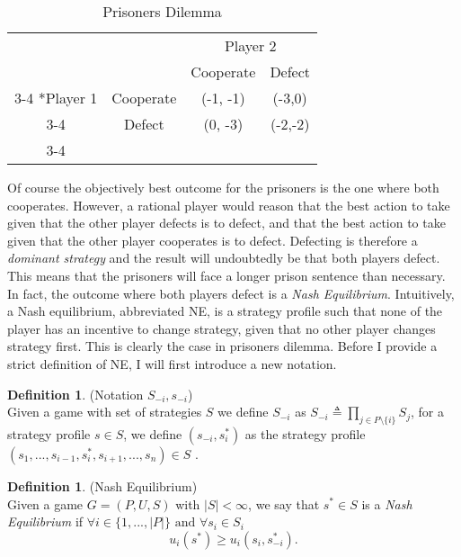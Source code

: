 \documentclass{article}
\theoremstyle{definition}
\newtheorem{definition}[theorem]{Definition}
\theoremstyle{remark}
\begin{document}
\begin{table}[h!]
  \centering
  \setlength{\extrarowheight}{2pt}
  \begin{tabular}{cc|c|c|}
    & \multicolumn{1}{c}{} & \multicolumn{2}{c}{Player 2}\\
    & \multicolumn{1}{c}{} & \multicolumn{1}{c}{Cooperate}  &
                                                              \multicolumn{1}{c}{Defect}
    \\\cline{3-4}
    \multirow{2}*{Player 1}  & Cooperate & (-1, -1) &
                                                                   (-3,0) \\\cline{3-4}
    & Defect & (0, -3) & (-2,-2) \\\cline{3-4}
  \end{tabular}
  \caption{Prisoners Dilemma}
  \label{Prisoners Dilemma}
\end{table}

Of course the objectively best outcome for the prisoners is the one
where both cooperates. However, a rational player would reason that the
best action to take given that the other player defects is to defect, and
that the best action to take given that the other player cooperates is
to defect. Defecting is therefore a \emph{dominant strategy} and the
result will undoubtedly be that both players defect. This means that
the prisoners will face a longer prison sentence than necessary. In
fact, the outcome where both players defect is a \emph{Nash
  Equilibrium}. Intuitively, a Nash equilibrium, abbreviated NE, is a
strategy profile such that none of the player has an incentive to
change strategy, given that no other player changes strategy
first. This is clearly the case in prisoners dilemma. Before I provide
a strict definition of NE, I will first introduce a new notation.

\begin{definition}(Notation $S_{-i}, s_{-i}$)\label{Notation S-i}\\
Given a game with set of strategies $S$ we define $S_{-i}$ as $S_{-i} \triangleq
\prod_{j \in P \setminus \{i\}} S_j$, for a strategy profile $s \in
S$, we define $(s_{-i},s^*_i)$ as the strategy profile
$(s_1,...,s_{i-1},s^*_i,s_{i+1},...,s_n) \in S$
\citep{Gonzalez-Diaz2010}.
\end{definition}

\begin{definition}(Nash Equilibrium)\label{NE}\\
  Given a game $G = (P,U,S)$ with $|S| < \infty$, we say that $s^* \in S$ is a
  \emph{Nash Equilibrium} if $\forall i \in
  \{1,...,|P|\} \text{ and }\forall s_i \in S_i$ $$ u_i(s^*) \geq u_i(s_i,s_{-i}^*).$$ 
\end{definition}
\end{document}
